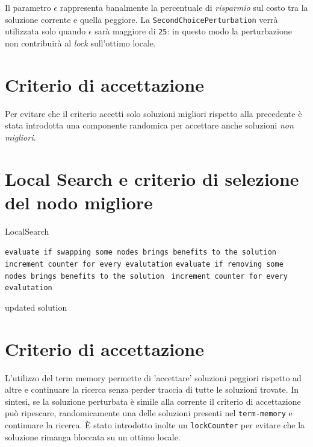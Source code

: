 \documentclass[11pt]{article}
\begin{document}
Il parametro $\epsilon$ rappresenta banalmente la percentuale di \textit{risparmio} sul costo tra la soluzione corrente e quella peggiore.
La \texttt{SecondChoicePerturbation} verrà utilizzata solo quando $\epsilon$ sarà maggiore di \verb|25|: in questo modo la perturbazione non contribuirà al \textit{lock} sull'ottimo locale.

\pagebreak


\section{Criterio di accettazione}

Per evitare che il criterio accetti solo soluzioni migliori rispetto alla precedente è stata introdotta una componente randomica per accettare anche soluzioni \textit{non migliori}.

\section{Local Search e criterio di selezione del nodo migliore}

\begin{algorithm}
\caption{LocalSearch}
\begin{algorithmic}

    \State\texttt{evaluate if swapping some nodes brings benefits to the solution }
    \State\texttt{increment counter for every evalutation}
\Else{}
\State\texttt{evaluate if removing some nodes brings benefits to the solution }
    \State\texttt{increment counter for every evalutation}
\EndIf{}


\State \Return updated solution
\end{algorithmic}
\end{algorithm}

\pagebreak

\section{Criterio di accettazione}

L'utilizzo del term memory permette di 'accettare' soluzioni peggiori rispetto ad altre e continuare la ricerca senza perder traccia di tutte le soluzioni trovate.
In sintesi, se la soluzione perturbata è simile alla corrente il criterio di accettazione può ripescare, randomicamente una delle soluzioni presenti nel \verb|term-memory| e continuare la ricerca.
È stato introdotto inolte un \verb|lockCounter| per evitare che la soluzione rimanga bloccata su un ottimo locale.
\end{document}
